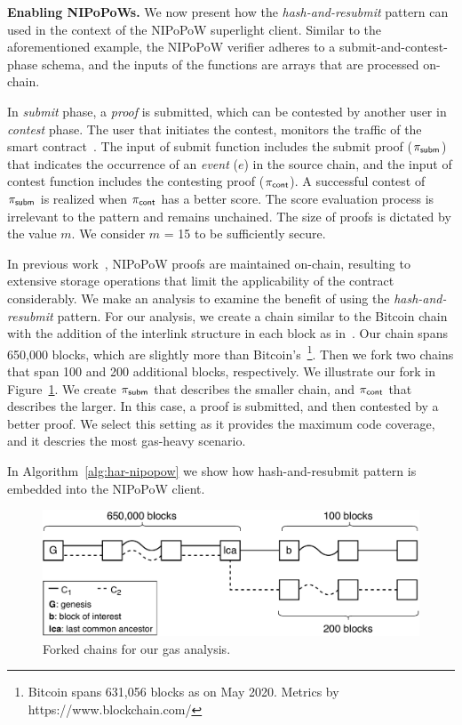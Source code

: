 \noindent \textbf{Enabling NIPoPoWs.} We now present how the
\emph{hash-and-resubmit} pattern can used in the context of the NIPoPoW
superlight client. Similar to the aforementioned example, the NIPoPoW verifier
adheres to a submit-and-contest-phase schema, and the inputs of the functions
are arrays that are processed on-chain.

In \emph{submit} phase, a \emph{proof} is submitted, which can be contested by
another user in \emph{contest} phase. The user that initiates the contest,
monitors the traffic of the smart contract~\cite{nipopows}. The input of
\textsf{submit} function includes the submit proof ($\mathsf{\pi_{subm}}$) that indicates the
occurrence of an \emph{event} ($e$) in the source chain, and the input of
\textsf{contest} function includes the contesting proof ($\mathsf{\pi_{cont}}$). A successful
contest of $\mathsf{\pi_{subm}}$ is realized when $\mathsf{\pi_{cont}}$ has a better score. The score
evaluation process is irrelevant to the pattern and remains unchained. The size
of proofs is dictated by the value $m$. We consider $m$ = 15 to be sufficiently
secure.

In previous work~\cite{gglou}, NIPoPoW proofs are maintained on-chain,
resulting to extensive storage operations that limit the applicability of the
contract considerably. We make an analysis to examine the benefit of using the
\emph{hash-and-resubmit} pattern. For our analysis, we create a chain similar
to the Bitcoin chain with the addition of the interlink structure in each block
as in~\cite{gglou}. Our chain spans 650,000 blocks, which are slightly more
than Bitcoin's~\footnote{Bitcoin spans 631,056 blocks as on May 2020. Metrics
by https://www.blockchain.com/}. Then we fork two chains that span 100 and 200
additional blocks, respectively. We illustrate our fork in
Figure~\ref{fig:chains}. We create $\mathsf{\pi_{subm}}$ that describes the smaller chain, and
$\mathsf{\pi_{cont}}$ that describes the larger. In this case, a proof is submitted, and then
contested by a better proof. We select this setting as it provides the maximum
code coverage, and it descries the most gas-heavy scenario.

In Algorithm~\ref{alg:har-nipopow} we show how
hash-and-resubmit pattern is embedded into the NIPoPoW client.

\begin{figure}[!h]
    \begin{center}
        \includegraphics[width=1\columnwidth]{figures/nipopow-subm-cont}
    \end{center}
    \caption{Forked chains for our gas analysis.}
    \label{fig:chains}
\end{figure}

